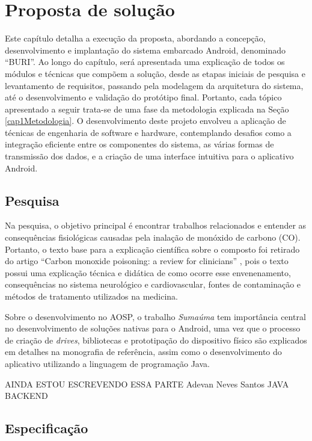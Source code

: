 \chapter{Proposta de solução}

Este capítulo detalha a execução da proposta, abordando a concepção, desenvolvimento e 
implantação do sistema embarcado Android, denominado ``BURI''. Ao longo do capítulo, será apresentada uma explicação de todos os 
módulos e técnicas que compõem a solução, desde as etapas iniciais de pesquisa e levantamento de requisitos, passando pela modelagem da arquitetura do sistema, 
até o desenvolvimento e validação do protótipo final. Portanto, cada tópico apresentado a seguir trata-se de uma fase da metodologia 
explicada na Seção \ref{cap1Metodologia}. O desenvolvimento deste projeto envolveu a aplicação de técnicas de engenharia de software e hardware, contemplando desafios 
como a integração eficiente entre os componentes do sistema, as várias formas de transmissão dos dados, e a criação de uma interface intuitiva para o aplicativo Android.

\section{Pesquisa}

Na pesquisa, o objetivo principal é encontrar trabalhos relacionados e entender as consequências fisiológicas causadas pela 
inalação de monóxido de carbono (CO). Portanto, o texto base para a explicação científica sobre o composto foi retirado 
do artigo ``Carbon monoxide poisoning: a review for clinicians'' \cite{carbon-monoxide-poisoning-varon}, pois o texto possui 
uma explicação técnica e didática de como ocorre esse envenenamento, consequências no sistema neurológico e cardiovascular, fontes de 
contaminação e métodos de tratamento utilizados na medicina.

Sobre o desenvolvimento no AOSP, o trabalho \textit{Sumaúma} \cite{ufam-aosp-sumama} tem importância central no desenvolvimento de 
soluções nativas para o Android, uma vez que o processo de criação de \textit{drives}, bibliotecas e prototipação do dispositivo físico são 
explicados em detalhes na monografia de referência, assim como o desenvolvimento do aplicativo utilizando a linguagem de programação Java.

AINDA ESTOU ESCREVENDO ESSA PARTE
Adevan Neves Santos JAVA BACKEND

\section{Especificação}

